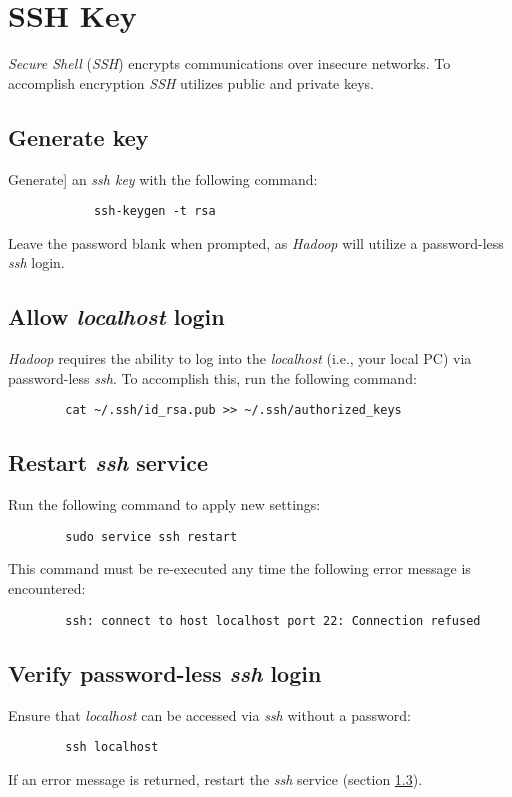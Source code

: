 \documentclass{article}
\begin{document}
\section{SSH Key}
\emph{Secure Shell} (\emph{SSH}) encrypts communications over insecure networks. To accomplish encryption
\emph{SSH} utilizes public and private keys.

    \subsection{Generate key}
     Generate] an \emph{ssh key} with the following command:
        \begin{verbatim}
            ssh-keygen -t rsa
        \end{verbatim}
    Leave the password blank when prompted, as \emph{Hadoop} will utilize a password-less \emph{ssh}
    login.

    \subsection{Allow \emph{localhost} login}
    \emph{Hadoop} requires the ability to log into the \emph{localhost} (i.e., your local PC) via
    password-less \emph{ssh}. To accomplish this, run the following command:
    \begin{verbatim}
        cat ~/.ssh/id_rsa.pub >> ~/.ssh/authorized_keys
    \end{verbatim}

    \subsection{Restart \emph{ssh} service}
    \label{sec:sshrestart}
    Run the following command to apply new settings:
    \begin{verbatim}
        sudo service ssh restart
    \end{verbatim}
    This command must be re-executed any time the following error message is encountered:
    \begin{verbatim}
        ssh: connect to host localhost port 22: Connection refused
    \end{verbatim}

    \subsection{Verify password-less \emph{ssh} login}
    Ensure that \emph{localhost} can be accessed via \emph{ssh} without a password:
    \begin{verbatim}
        ssh localhost
    \end{verbatim}
    If an error message is returned, restart the \emph{ssh} service (section \ref{sec:sshrestart}).
\end{document}
